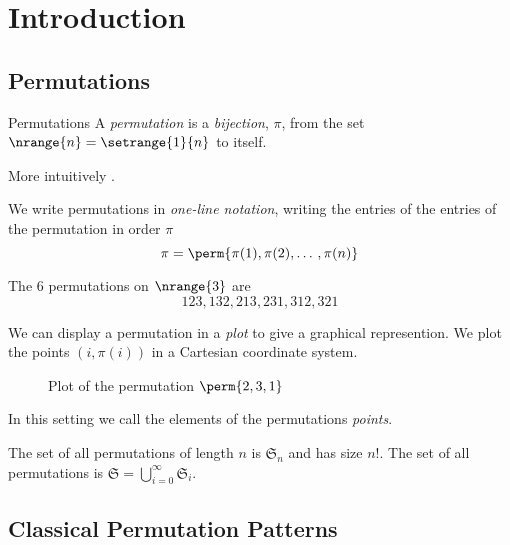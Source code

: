 \section{Introduction}
\label{sec:Introduction}
\subsection{Permutations}
\label{sub:Permutations}

\begin{frame}{Permutations}
  A \emph{permutation} is a \emph{bijection}, \(\pi\), from the set
  \(\nrange{n} = \setrange{1}{n}\) to itself.

  More intuitively .

  We write permutations in \emph{one-line notation}, writing the entries of
  the entries of the permutation in order \(\pi\)
  \begin{equation*}
    \pi = \perm{\pi(1),\pi(2),\dotso,\pi(n)}
  \end{equation*}
  \begin{example} The \(6\) permutations on \(\nrange{3}\) are
    \begin{equation*}
      123, 132, 213, 231, 312, 321
    \end{equation*}
  \end{example}
\end{frame}

\begin{frame}
  We can display a permutation in a \emph{plot} to give a graphical
  represention. We plot the points \((i,\pi(i))\) in a Cartesian coordinate
  system.
  \begin{figure}[htb]
    \centering
    \caption{Plot of the permutation \(\perm{2,3,1}\)}
  \end{figure}
  In this setting we call the elements of the permutations \emph{points}.

  The set of all permutations of length \(n\) is \(\mathfrak{S}_n\) and
  has size \(n!\). The set of all permutations is
  \(\mathfrak{S}=\bigcup_{i=0}^{\infty}\mathfrak{S}_i\).
\end{frame}
\subsection{Classical Permutation Patterns}
\label{sub:Classical Permutation Patterns}

